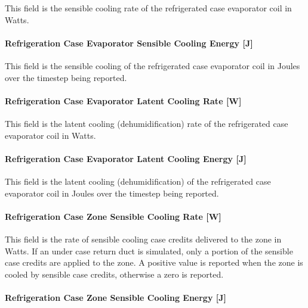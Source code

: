 This field is the sensible cooling rate of the refrigerated case evaporator coil in Watts.

\paragraph{Refrigeration Case Evaporator Sensible Cooling Energy {[}J{]}}\label{refrigeration-case-evaporator-sensible-cooling-energy-j}

This field is the sensible cooling of the refrigerated case evaporator coil in Joules over the timestep being reported.

\paragraph{Refrigeration Case Evaporator Latent Cooling Rate {[}W{]}}\label{refrigeration-case-evaporator-latent-cooling-rate-w}

This field is the latent cooling (dehumidification) rate of the refrigerated case evaporator coil in Watts.

\paragraph{Refrigeration Case Evaporator Latent Cooling Energy {[}J{]}}\label{refrigeration-case-evaporator-latent-cooling-energy-j}

This field is the latent cooling (dehumidification) of the refrigerated case evaporator coil in Joules over the timestep being reported.

\paragraph{Refrigeration Case Zone Sensible Cooling Rate {[}W{]}}\label{refrigeration-case-zone-sensible-cooling-rate-w}

This field is the rate of sensible cooling case credits delivered to the zone in Watts. If an under case return duct is simulated, only a portion of the sensible case credits are applied to the zone. A positive value is reported when the zone is cooled by sensible case credits, otherwise a zero is reported.

\paragraph{Refrigeration Case Zone Sensible Cooling Energy {[}J{]}}\label{refrigeration-case-zone-sensible-cooling-energy-j}

